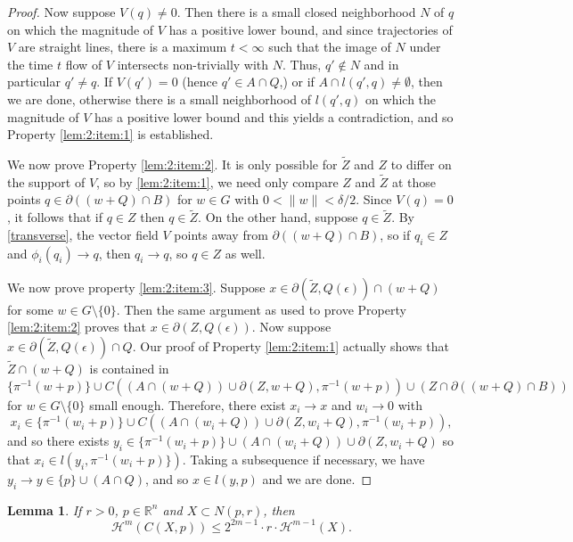 \documentclass[10pt]{amsart}
\newtheorem{lem}[thm]{Lemma}
\theoremstyle{definition}
\theoremstyle{definition}
\theoremstyle{definition}
\theoremstyle{definition}
\theoremstyle{definition}
\theoremstyle{definition}
\theoremstyle{definition}
\newcommand{\R}{\ensuremath{\mathbb{R}}}
\newcommand{\<}{\langle}
\renewcommand{\>}{\rangle}
\def\i{\infty}
\def\fr{\partial}
\def\d{\delta}
\def\e{\epsilon}
\def\H{\mathcal{H}}
\begin{document}
\begin{proof}
	Now suppose \( V(q)\neq 0 \). Then there is a small closed neighborhood \( N \) of \( q \) on which the magnitude of \( V \) has a positive lower bound, and since trajectories of \( V \) are straight lines, there is a maximum \( t<\i \) such that the image of \( N \) under the time \( t \) flow of \( V \) intersects non-trivially with \( N \). Thus, \( q'\notin N \) and in particular \( q'\neq q \). If \( V(q')=0 \) (hence \( q'\in A\cap Q \),) or if \( A\cap l(q',q)\neq \emptyset \), then we are done, otherwise there is a small neighborhood of \( l(q', q) \) on which the magnitude of \( V \) has a positive lower bound and this yields a contradiction, and so Property \ref{lem:2:item:1} is established.
	
	We now prove Property \ref{lem:2:item:2}. It is only possible for \( \tilde{Z} \) and \( Z \) to differ on the support of \( V \), so by \ref{lem:2:item:1}, we need only compare \( Z \) and \( \tilde{Z} \) at those points \( q\in \fr((w+Q)\cap B) \) for \( w\in G \) with \( 0<\|w\|<\d/2 \). Since \( V(q)=0 \), it follows that if \( q\in Z \) then \( q\in \tilde{Z} \). On the other hand, suppose \( q\in \tilde{Z} \). By \eqref{transverse}, the vector field \( V \) points away from \( \fr((w+Q)\cap B) \), so if \( q_i\in Z \) and \( \phi_i(q_i)\to q \), then \( q_i\to q \), so \( q\in Z \) as well. 
	
	We now prove property \ref{lem:2:item:3}. Suppose \( x\in \fr(\tilde{Z},Q(\e))\cap (w+Q) \) for some \( w\in G \setminus \{ 0\} \). Then the same argument as used to prove Property \ref{lem:2:item:2} proves that \( x\in \fr(Z,Q(\e)) \). Now suppose \( x\in \fr(\tilde{Z},Q(\e))\cap Q \). Our proof of Property \ref{lem:2:item:1} actually shows that \( \tilde{Z}\cap (w+Q) \) is contained in \[ \{\pi^{-1}(w+p)\}\cup C((A\cap(w+Q))\cup \fr(Z,w+Q),\pi^{-1}(w+p)) \cup (Z\cap \fr((w+Q)\cap B)) \] for \( w\in G \setminus \{ 0\} \) small enough. Therefore, there exist \( x_i\to x \) and \( w_i\to 0 \) with \[ x_i\in \{\pi^{-1}(w_i+p)\}\cup C((A\cap (w_i+Q))\cup \fr(Z,w_i+Q),\pi^{-1}(w_i+p)), \] and so there exists \( y_i\in \{\pi^{-1}(w_i+p)\}\cup(A\cap(w_i+Q))\cup \fr(Z,w_i+Q) \) so that \( x_i\in l(y_i,\pi^{-1}(w_i+p)\}) \). Taking a subsequence if necessary, we have \( y_i\to y\in \{p\}\cup (A\cap Q) \), and so \( x\in l(y,p) \) and we are done.
\end{proof}

\begin{lem}
	\label{lem:6}
	If \( r>0 \), \( p\in \R^n \) and \( X\subset N(p,r) \), then \[ \H^m (C(X,p))\leq 2^{2m-1} \cdot r\cdot \H^{m-1} (X). \]
\end{lem}
\end{document}
